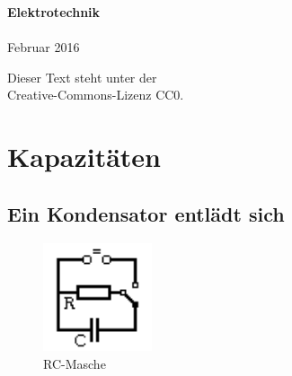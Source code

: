 \documentclass[a4paper,10pt,fleqn,twocolumn,twoside]{article}
\numberwithin{equation}{section}
\begin{document}

\noindent
\textbf{\sffamily\huge Elektrotechnik}\\
\\
Februar 2016
\vspace{1em}

\noindent
Dieser Text steht unter der\\
Creative-Commons-Lizenz CC0.


\tableofcontents

\section{Kapazitäten}
\subsection{Ein Kondensator entlädt sich}

\begin{figure}[h]
\centering
\includegraphics[width=32mm]{img/RC.png}
\caption{RC-Masche}
\label{RC}
\end{figure}
\end{document}

